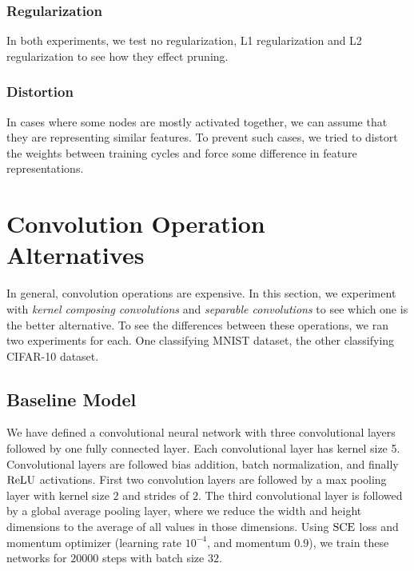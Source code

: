 \subsubsection{Regularization}
In both experiments, we test no regularization, L1 regularization and L2 regularization to see how they effect pruning.

\subsubsection{Distortion}
In cases where some nodes are mostly activated together, we can assume that they are representing similar features. To prevent such cases, we tried to distort the weights between training cycles and force some difference in feature representations.

\section{Convolution Operation Alternatives}
\label{sec:conv_alternatives}
In general, convolution operations are expensive. In this section, we experiment with \textit{kernel composing convolutions} and \textit{separable convolutions} to see which one is the better alternative. To see the differences between these operations, we ran two experiments for each. One classifying MNIST dataset, the other classifying CIFAR-10 dataset.

\subsection{Baseline Model}
We have defined a convolutional neural network with three convolutional layers followed by one fully connected layer. Each convolutional layer has kernel size 5. Convolutional layers are followed bias addition, batch normalization, and finally $\textrm{ReLU}$ activations. First two convolution layers are followed by a max pooling layer with kernel size $2$ and strides of $2$. The third convolutional layer is followed by a global average pooling layer, where we reduce the width and height dimensions to the average of all values in those dimensions. Using $\textrm{SCE}$ loss and momentum optimizer (learning rate $10^{-4}$, and momentum $0.9$), we train these networks for $20000$ steps with batch size $32$. 


